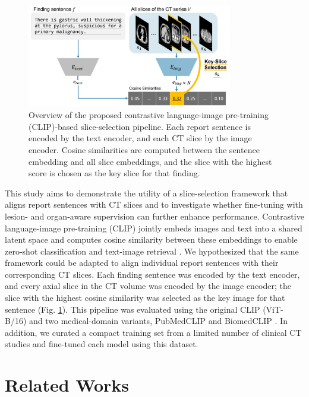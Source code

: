 \documentclass[bioengineering,article,submit,pdftex,moreauthors]{Definitions/mdpi}
\begin{document}
\begin{figure}[ht]
  \centering
  \includegraphics[width=0.8\textwidth]{./figures/figure1_9.png}
  \caption{
    Overview of the proposed contrastive language-image pre-training (CLIP)-based slice-selection pipeline. 
    Each report sentence is encoded by the text encoder, and each CT slice by the image encoder. 
    Cosine similarities are computed between the sentence embedding and all slice embeddings, and the slice with the highest score is chosen as the key slice for that finding. 
}
  \label{fig:clip_overview}
\end{figure}


This study aims to demonstrate the utility of a slice-selection framework that aligns report sentences with CT slices and to investigate whether fine-tuning with lesion- and organ-aware supervision can further enhance performance.
Contrastive language-image pre-training (CLIP) jointly embeds images and text into a shared latent space and computes cosine similarity between these embeddings to enable zero-shot classiﬁcation and text-image retrieval \cite{radford_learning_2021}. 
We hypothesized that the same framework could be adapted to align individual report sentences with their corresponding CT slices. 
Each finding sentence was encoded by the text encoder, and every axial slice in the CT volume was encoded by the image encoder; the slice with the highest cosine similarity was selected as the key image for that sentence (Fig. \ref{fig:clip_overview}). 
This pipeline was evaluated using the original CLIP (ViT-B/16) and two medical-domain variants, PubMedCLIP and BiomedCLIP \cite{radford_learning_2021,eslami_pubmedclip_2023,zhang_biomedclip_2025}. 
In addition, we curated a compact training set from a limited number of clinical CT studies and fine-tuned each model using this dataset. 




\section{Related Works}
\end{document}
